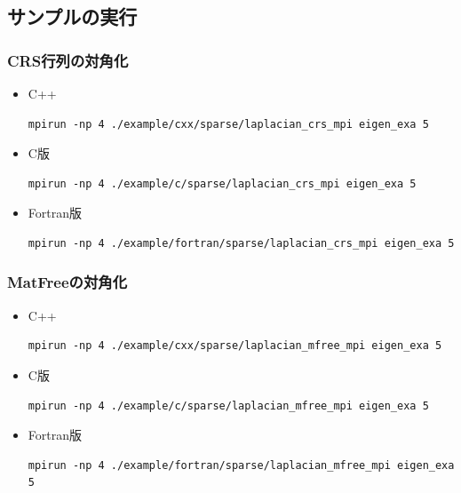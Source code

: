 \subsection{サンプルの実行}
\begin{frame}[c,fragile]
  \frametitle{CRS行列の対角化}
  \begin{itemize}
  \item C++ 
\begin{lstlisting}[style=shstyle]
mpirun -np 4 ./example/cxx/sparse/laplacian_crs_mpi eigen_exa 5
\end{lstlisting}
  \item C版 
\begin{lstlisting}[style=shstyle]
mpirun -np 4 ./example/c/sparse/laplacian_crs_mpi eigen_exa 5
\end{lstlisting}
  \item Fortran版 
\begin{lstlisting}[style=shstyle]
mpirun -np 4 ./example/fortran/sparse/laplacian_crs_mpi eigen_exa 5
\end{lstlisting}
  \end{itemize}
\end{frame}

\begin{frame}[c,fragile]
  \frametitle{MatFreeの対角化}
  \begin{itemize}
  \item C++ 
\begin{lstlisting}[style=shstyle]
mpirun -np 4 ./example/cxx/sparse/laplacian_mfree_mpi eigen_exa 5
\end{lstlisting}
  \item C版 
\begin{lstlisting}[style=shstyle]
mpirun -np 4 ./example/c/sparse/laplacian_mfree_mpi eigen_exa 5
\end{lstlisting}
  \item Fortran版 
\begin{lstlisting}[style=shstyle]
mpirun -np 4 ./example/fortran/sparse/laplacian_mfree_mpi eigen_exa 5
\end{lstlisting}
  \end{itemize}
\end{frame}

